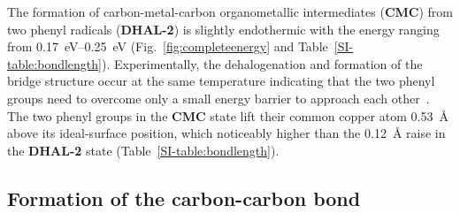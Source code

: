 \documentclass[journal=jacsat,manuscript=article]{achemso}
\newcommand{\lock}{\color{red}}
\newcommand{\lock}{\color{black}}
\begin{document}
{\lock

The formation of carbon-metal-carbon organometallic intermediates (\textbf{CMC}) from two phenyl radicals (\textbf{DHAL-2}) is slightly endothermic with the energy ranging from \SIrange{0.17}{0.25}{\electronvolt} (Fig.~\ref{fig:completeenergy} and Table~\ref{SI-table:bondlength}). Experimentally, the dehalogenation and formation of the bridge structure occur at the same temperature indicating that the two phenyl groups need to overcome only a small energy barrier to approach each other~\cite{ullmann_88}. 
%
The two phenyl groups in the \textbf{CMC} state lift their common copper atom \SI{0.53}{\angstrom} above its ideal-surface position, which noticeably higher than the \SI{0.12}{\angstrom} raise in the \textbf{DHAL-2} state (Table~\ref{SI-table:bondlength}).




}

\ifdefined\INTERNAL
\subsection{Formation of the carbon-carbon bond}
\fi
\end{document}
